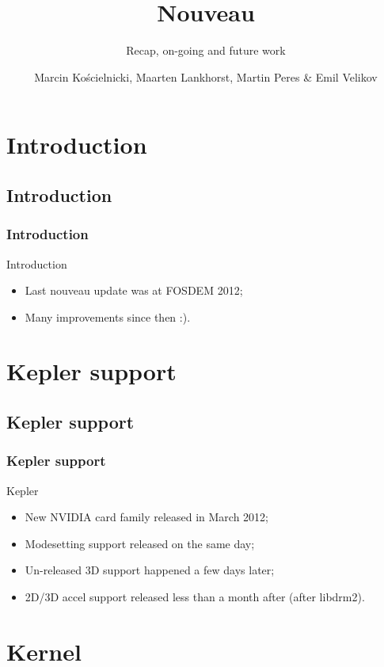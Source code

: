 \documentclass[11pt,english,compress]{beamer}
\title{Nouveau}
\subtitle{Recap, on-going and future work}
\author{Marcin Kościelnicki, Maarten Lankhorst, Martin Peres \& Emil Velikov}
\institute{Nouveau developers (or related)}
\begin{document}

\begin{frame}
	\titlepage
\end{frame}

\section{Introduction}
\subsection*{Introduction}
\begin{frame}
	\frametitle{Introduction}

	\begin{block}{Introduction}
		\begin{itemize}
			\item Last nouveau update was at FOSDEM 2012;
			\item Many improvements since then :).
		\end{itemize}
	\end{block}
\end{frame}

\section{Kepler support}
\subsection*{Kepler support}
\begin{frame}
	\frametitle{Kepler support}

	\begin{block}{Kepler}
		\begin{itemize}
			\item New NVIDIA card family released in March 2012;
			\item Modesetting support released on the same day;
			\item Un-released 3D support happened a few days later;
			\item 2D/3D accel support released less than a month after (after libdrm2).
		\end{itemize}
	\end{block}
\end{frame}

\section{Kernel}
\end{document}
